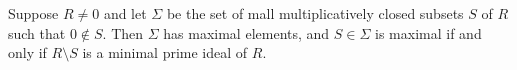 Suppose $R\neq 0$ and let $\Sigma$ be the set of mall multiplicatively closed
subsets $S$ of $R$ such that $0\notin S$. Then $\Sigma$ has maximal elements,
and $S \in \Sigma$ is maximal if and only if $R\setminus S$ is a minimal prime
ideal of $R$.

